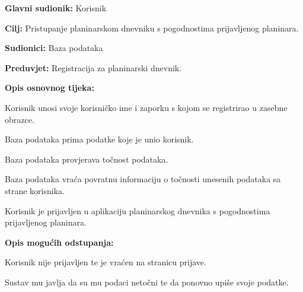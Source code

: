 		
		
		\noindent {}
		\begin{packed_item}
			
			\item \textbf{Glavni sudionik: } Korisnik
			\item  \textbf{Cilj:} Pristupanje planinarskom dnevniku s pogodnostima prijavljenog planinara.
			\item  \textbf{Sudionici:} Baza podataka
			\item  \textbf{Preduvjet:} Registracija za planinarski dnevnik.
			\item  \textbf{Opis osnovnog tijeka:}
			
			\item[] \begin{packed_enum}
				
				\item Korisnik unosi svoje korisničko ime i zaporku s kojom se registrirao u zasebne obrazce.
				\item Baza podataka prima podatke koje je unio korisnik.
				\item Baza podataka provjerava točnost podataka.
				\item Baza podataka vraća povratnu informaciju o točnosti unesenih podataka sa strane korisnika.
				\item Korisnik je prijavljen u aplikaciju planinarskog dnevnika s pogodnostima prijavljenog planinara.
				
			\end{packed_enum}
			
			\item	\textbf{Opis mogućih odstupanja:}
			
			\item[] \begin{packed_item}
				
				\item[5.a] Korisnik nije prijavljen te je vraćen na stranicu prijave.
				\item[] \begin{packed_enum}
					
					\item Sustav mu javlja da su mu podaci netočni te da ponovno upiše svoje podatke.
				\end{packed_enum}
				
			\end{packed_item}
		\end{packed_item}
		
